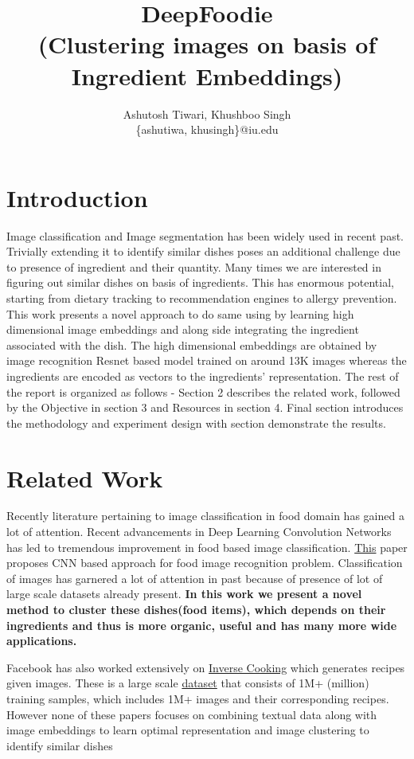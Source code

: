 \documentclass{article}
\title{DeepFoodie \\(Clustering images on basis of Ingredient Embeddings)}
\author{Ashutosh Tiwari, Khushboo Singh \\ \{ashutiwa, khusingh\}@iu.edu}
\begin{document}
\maketitle
\begin{abstract}

\end{abstract}
\section{Introduction}
Image classification and Image segmentation has been widely used in recent past. Trivially extending it to identify similar dishes poses an additional challenge due to presence of ingredient and their quantity. Many times we are interested in figuring out similar dishes on basis of ingredients. This has enormous potential, starting from dietary tracking to recommendation engines to allergy prevention. This work presents a novel approach to do same using by learning high dimensional image embeddings and along side integrating the ingredient associated with the dish. The high dimensional embeddings are obtained by image recognition Resnet based model trained on around 13K images whereas the ingredients are encoded as vectors to the ingredients' representation. The rest of the report is organized as follows - Section 2 describes the related work, followed by the Objective in section 3 and Resources in section 4. Final section introduces the methodology and experiment design with section  demonstrate the results.

\section{Related Work}
Recently literature pertaining to image classification in food domain has gained a lot of attention. Recent advancements in Deep Learning Convolution Networks has led to tremendous improvement in food based image classification. \href{https://arxiv.org/ftp/arxiv/papers/1606/1606.05675.pdf}{This} paper proposes CNN based approach for food image recognition problem. Classification of images has garnered a lot of attention in past because of presence of lot of large scale datasets already present. \textbf{In  this work we present a novel method to cluster these dishes(food items), which depends on their ingredients and thus is more organic, useful and has many more wide applications.}

Facebook has also worked extensively on \href{https://arxiv.org/pdf/1812.06164.pdf}{Inverse Cooking} which generates recipes given images. These is a large scale \href{http://pic2recipe.csail.mit.edu/}{dataset} that consists of 1M+ (million) training samples, which includes 1M+ images and their corresponding recipes. However none of these papers focuses on combining textual data along with image embeddings to learn optimal representation and image clustering to identify similar dishes 
\end{document}
